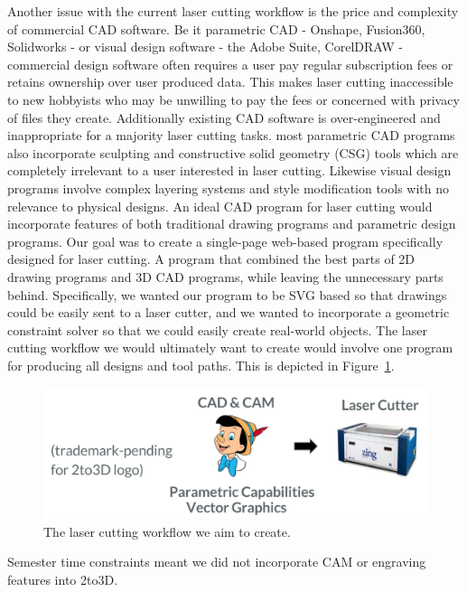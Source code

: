 Another issue with the current laser cutting workflow is the price and complexity of commercial CAD software. Be it parametric CAD - Onshape, Fusion360, Solidworks - or visual design software - the Adobe Suite, CorelDRAW - commercial design software often requires a user pay regular subscription fees or retains ownership over user produced data. This makes laser cutting inaccessible to new hobbyists who may be unwilling to pay the fees or concerned with privacy of files they create. Additionally existing CAD software is over-engineered and inappropriate for a majority laser cutting tasks. most parametric CAD programs also incorporate sculpting and constructive solid geometry (CSG) tools which are completely irrelevant to a user interested in laser cutting. Likewise visual design programs involve complex layering systems and style modification tools with no relevance to physical designs. An ideal CAD program for laser cutting would incorporate features of both traditional drawing programs and parametric design programs. Our goal was to create a single-page web-based program specifically designed for laser cutting. A program that combined the best parts of 2D drawing programs and 3D CAD programs, while leaving the unnecessary parts behind. Specifically, we wanted our program to be SVG based so that drawings could be easily sent to a laser cutter, and we wanted to incorporate a geometric constraint solver so that we could easily create real-world objects. The laser cutting workflow we would ultimately want to create would involve one program for producing all designs and tool paths. This is depicted in Figure~\ref{fig:2to3DWorkflow}.

\begin{figure}[h]
  \includegraphics[width=\linewidth]{2to3DWorkflow.jpg}
  \caption{The laser cutting workflow we aim to create.}
  \label{fig:2to3DWorkflow}
\end{figure}

Semester time constraints meant we did not incorporate CAM or engraving features into 2to3D.